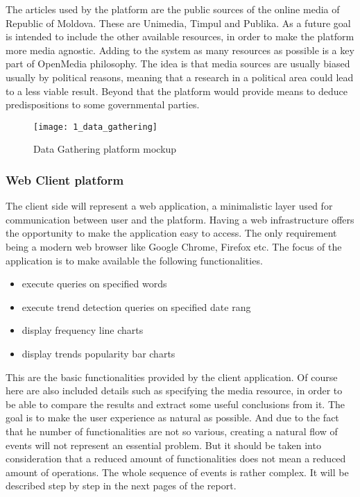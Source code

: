 The articles used by the platform are the public sources of the online media of Republic of Moldova. These are Unimedia, Timpul and Publika. As a future goal is intended to include the other available resources, in order to make the platform more media agnostic. Adding to the system as many resources as possible is a key part of OpenMedia philosophy. The idea is that media sources are usually biased usually by political reasons, meaning that a research in a political area could lead to a less viable result. Beyond that the platform would provide means to deduce predispositions to some governmental parties.



\begin{figure}[!ht]
\centering
\texttt{[image: 1\_data\_gathering]}
\caption{Data Gathering platform mockup}\label{data_gathering_mock}
\end{figure}

\subsubsection{Web Client platform}
The client side will represent a web application, a minimalistic layer used for communication between user and the platform. Having a web infrastructure offers the opportunity to make the application easy to access. The only requirement being a modern web browser like Google Chrome, Firefox etc. The focus of the application is to make available the following functionalities.
\begin{itemize}
    \item execute queries on specified words
    \item execute trend detection queries on specified date rang
    \item display frequency line charts
    \item display trends popularity bar charts
\end{itemize}

This are the basic functionalities provided by the client application. Of course here are also included details such as specifying the media resource, in order to be able to compare the results and extract some useful conclusions from it. The goal is to make the user experience as natural as possible. And due to the fact that he number of functionalities are not so various, creating a natural flow of events will not represent an essential problem. But it should be taken into consideration that a reduced amount of functionalities does not mean a reduced amount of operations. The whole sequence of events is rather complex. It will be described step by step in the next pages of the report.

